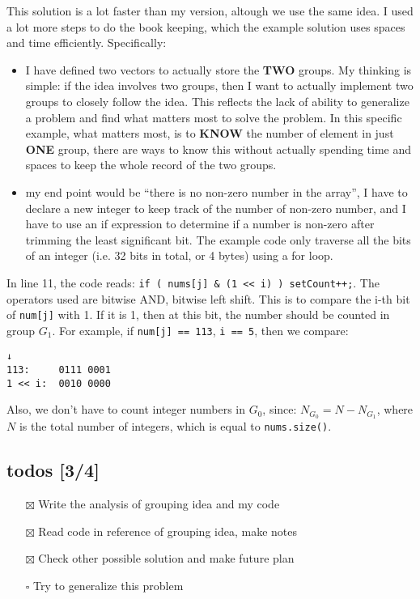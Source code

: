 \documentclass[11pt]{article}
\begin{document}
This solution is a lot faster than my version, altough we use the same idea. I used a lot more steps to do the book keeping, which the example solution uses spaces and time efficiently. Specifically:
\begin{itemize}
\item I have defined two vectors to actually store the \textbf{TWO} groups. My thinking is simple: if the idea involves two groups, then I want to actually implement two groups to closely follow the idea. This reflects the lack of ability to generalize a problem and find what matters most to solve the problem. In this specific example, what matters most, is to \textbf{KNOW} the number of element in just \textbf{ONE} group, there are ways to know this without actually spending time and spaces to keep the whole record of the two groups.
\item my end point would be ``there is no non-zero number in the array'', I have to declare a new integer to keep track of the number of non-zero number, and I have to use an if expression to determine if a number is non-zero after trimming the least significant bit.  The example code only traverse all the bits of an integer (i.e. 32 bits in total, or 4 bytes) using a for loop.
\end{itemize}

In line 11, the code reads: \texttt{if ( nums[j] \& (1 << i) ) setCount++;}. The operators used are bitwise AND, bitwise left shift. This is to compare the i-th bit of \texttt{num[j]} with 1. If it is 1, then at this bit, the number should be counted in group \(G_1\). For example, if \texttt{num[j] == 113}, \texttt{i == 5}, then we compare:
\begin{Verbatim}[frame=single]
           ↓
113:     0111 0001
1 << i:  0010 0000
\end{Verbatim}

Also, we don't have to count integer numbers in \(G_0\), since: \(N_{G_0} = N - N_{G_1}\), where \(N\) is the total number of integers, which is equal to \texttt{nums.size()}.

\subsection{todos [3/4]}
\label{sec:org1e0dd04}
\begin{itemize}
\item[{$\boxtimes$}] Write the analysis of grouping idea and my code
\item[{$\boxtimes$}] Read code in reference of grouping idea, make notes
\item[{$\boxtimes$}] Check other possible solution and make future plan
\item[{$\square$}] Try to generalize this problem
\end{itemize}
\end{document}
